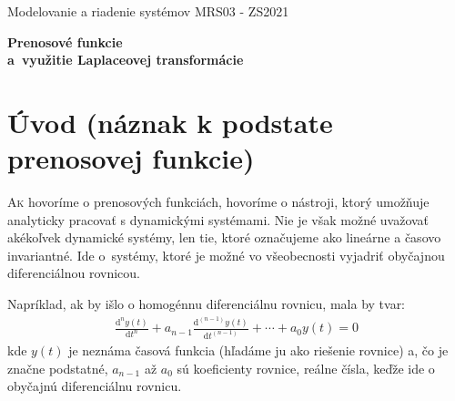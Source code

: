 \documentclass[a4paper, 10pt, ]{article}
\def\oznacenieCasti{MRS03 - ZS2021}
\begin{document}
\lstset{%
style=mystyle,
rangebeginprefix=\#\#\#\ cellB\ ,%
rangebeginsuffix=\ \#\#\#,%
rangeendprefix=\#\#\#\ cellE\ ,%
rangeendsuffix=\ \#\#\#,%
includerangemarker=false,
}




\fontsize{12pt}{22pt}\selectfont

\centerline{\textsf{Modelovanie a riadenie systémov} \hfill \textsf{\oznacenieCasti}}

\fontsize{18pt}{22pt}\selectfont





\begin{flushleft}
	\textbf{\textsf{Prenosové funkcie\\a~využitie Laplaceovej transformácie}}
\end{flushleft}





\normalsize

\bigskip

{\hypersetup{hidelinks}

\tableofcontents

}

\bigskip

\vspace{18pt}








\section{Úvod {\color{Gray} \normalsize (náznak k podstate prenosovej funkcie)}}
\label{predchcasttato}


\lettrine[lines=3, nindent=0pt]{A}{k} hovoríme o prenosových funkciách, hovoríme o nástroji, ktorý umožňuje analyticky pracovať s dynamickými systémami. Nie je však možné uvažovať akékoľvek dynamické systémy, len tie, ktoré označujeme ako lineárne a časovo invariantné. Ide o~systémy, ktoré je možné vo všeobecnosti vyjadriť obyčajnou diferenciálnou rovnicou.

Napríklad, ak by išlo o homogénnu diferenciálnu rovnicu, mala by tvar:
\begin{align} \label{vseobDifRov_h}
	\frac{\text{d}^n y(t)}{\text{d}t^n} + a_{n-1} \frac{\text{d}^{(n-1)} y(t)}{\text{d}t^{(n-1)}} + \cdots + a_0 y(t) = 0
\end{align}
kde $y(t)$ je neznáma časová funkcia (hľadáme ju ako riešenie rovnice) a, čo je značne podstatné, $a_{n-1}$ až $a_0$ sú koeficienty rovnice, reálne čísla, keďže ide o obyčajnú diferenciálnu rovnicu.
\end{document}
